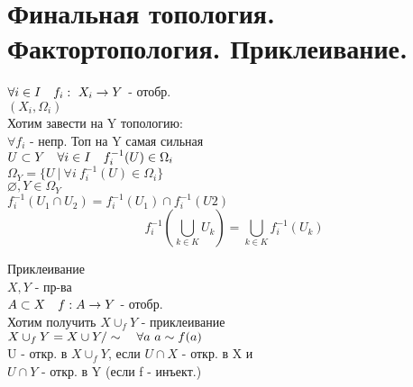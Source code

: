 \documentclass[geometry.tex]{subfiles}
\begin{document}
  \section{Финальная топология. Фактортопология. Приклеивание.}

  \begin{definition}
      $\forall i \in I \quad f_i: \ X_i \rightarrow Y$ - отобр.\\
      $(X_i, \Omega_i)$\\
      Хотим завести на Y топологию:\\
      $\forall f_i$ - непр. Топ на Y самая сильная \\
      $U \subset Y \quad \forall i \in I \quad f_i^{-1}(U) \in \Omega_i$\\
      $\Omega_Y = \{U \ | \ \forall i \ f_i^{-1}(U) \in \Omega_i\}$\\
      $\varnothing, Y \in \Omega_Y$\\
      $f_i^{-1}(U_1 \cap U_2) = f_i^{-1}(U_1) \cap f_i^{-1}(U2)$\\
      \[f_i^{-1}(\bigcup_{k \in K} U_k) = \bigcup_{k \in K} f_i^{-1}(U_k)\]
  \end{definition}

  \begin{example}
      Приклеивание\\
      $X, Y$ - пр-ва\\
      $A \subset X \quad f: A \rightarrow Y$ - отобр.\\
      Хотим получить $X \cup_f Y$ - приклеивание\\
      $X \cup_f Y = X \cup Y /\sim \quad \forall a \ a \sim f(a)$\\
      U - откр. в $X \cup_f Y$, если $U \cap X$ - откр. в X и\\ $U \cap Y$ - откр. в Y
      (если f - инъект.)
  \end{example}
\end{document}
